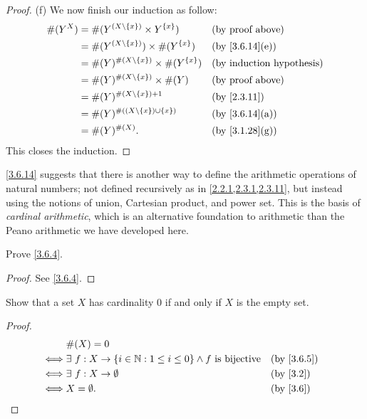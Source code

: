 \begin{proof}{(f)}
  We now finish our induction as follow:
  \begin{align*}
    \#(Y^X) & = \#(Y^{(X \setminus \{x\})} \times Y^{\{x\}})       &  & \text{(by proof above)}      \\
            & = \#(Y^{(X \setminus \{x\})}) \times \#(Y^{\{x\}})   &  & \text{(by \cref{3.6.14}(e))} \\
            & = \#(Y)^{\#(X \setminus \{x\})} \times \#(Y^{\{x\}}) &  & \byIH                        \\
            & = \#(Y)^{\#(X \setminus \{x\})} \times \#(Y)         &  & \text{(by proof above)}      \\
            & = \#(Y)^{\#(X \setminus \{x\}) + 1}                  &  & \text{(by \cref{2.3.11})}    \\
            & = \#(Y)^{\#((X \setminus \{x\}) \cup \{x\})}         &  & \text{(by \cref{3.6.14}(a))} \\
            & = \#(Y)^{\#(X)}.                                     &  & \text{(by \cref{3.1.28}(g))}
  \end{align*}
  This closes the induction.
\end{proof}

\begin{rmk}\label{3.6.15}
  \cref{3.6.14} suggests that there is another way to define the arithmetic operations of natural numbers;
  not defined recursively as in \cref{2.2.1,2.3.1,2.3.11}, but instead using the notions of union, Cartesian product, and power set.
  This is the basis of \emph{cardinal arithmetic}, which is an alternative foundation to arithmetic than the Peano arithmetic we have developed here.
\end{rmk}

\exercisesection

\begin{ex}\label{ex:3.6.1}
  Prove \cref{3.6.4}.
\end{ex}

\begin{proof}
  See \cref{3.6.4}.
\end{proof}

\begin{ex}\label{ex:3.6.2}
  Show that a set \(X\) has cardinality \(0\) if and only if \(X\) is the empty set.
\end{ex}

\begin{proof}
  \begin{align*}
         & \#(X) = 0                                                                                                  \\
    \iff & \exists\ f : X \to \{i \in \N : 1 \leq i \leq 0\} \land f \text{ is bijective} &  & \by{3.6.5}             \\
    \iff & \exists\ f : X \to \emptyset                                                   &  & \text{(by \cref{3.2})} \\
    \iff & X = \emptyset.                                                                 &  & \text{(by \cref{3.6})}
  \end{align*}
\end{proof}

